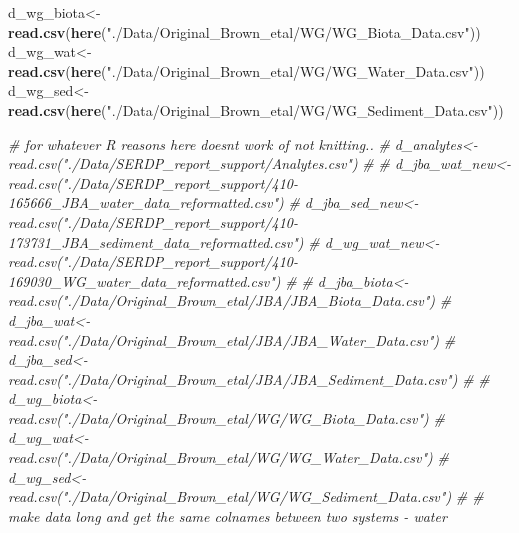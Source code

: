 \documentclass[
]{article}
\newenvironment{Shaded}{\begin{snugshade}}{\end{snugshade}}
\newcommand{\CommentTok}[1]{\textcolor[rgb]{0.56,0.35,0.01}{\textit{#1}}}
\newcommand{\FunctionTok}[1]{\textcolor[rgb]{0.13,0.29,0.53}{\textbf{#1}}}
\newcommand{\NormalTok}[1]{#1}
\newcommand{\OtherTok}[1]{\textcolor[rgb]{0.56,0.35,0.01}{#1}}
\newcommand{\StringTok}[1]{\textcolor[rgb]{0.31,0.60,0.02}{#1}}
\begin{document}
\begin{Shaded}
\begin{Highlighting}[]
\NormalTok{d\_wg\_biota}\OtherTok{\textless{}{-}}\FunctionTok{read.csv}\NormalTok{(}\FunctionTok{here}\NormalTok{(}\StringTok{"./Data/Original\_Brown\_etal/WG/WG\_Biota\_Data.csv"}\NormalTok{))}
\NormalTok{d\_wg\_wat}\OtherTok{\textless{}{-}}\FunctionTok{read.csv}\NormalTok{(}\FunctionTok{here}\NormalTok{(}\StringTok{"./Data/Original\_Brown\_etal/WG/WG\_Water\_Data.csv"}\NormalTok{))}
\NormalTok{d\_wg\_sed}\OtherTok{\textless{}{-}}\FunctionTok{read.csv}\NormalTok{(}\FunctionTok{here}\NormalTok{(}\StringTok{"./Data/Original\_Brown\_etal/WG/WG\_Sediment\_Data.csv"}\NormalTok{))}

\CommentTok{\# for whatever R reasons here doesnt work of not knitting.. }
\CommentTok{\# d\_analytes\textless{}{-}read.csv("./Data/SERDP\_report\_support/Analytes.csv")}
\CommentTok{\# }
\CommentTok{\# d\_jba\_wat\_new\textless{}{-}read.csv("./Data/SERDP\_report\_support/410{-}165666\_JBA\_water\_data\_reformatted.csv")}
\CommentTok{\# d\_jba\_sed\_new\textless{}{-}read.csv("./Data/SERDP\_report\_support/410{-}173731\_JBA\_sediment\_data\_reformatted.csv")}
\CommentTok{\# d\_wg\_wat\_new\textless{}{-}read.csv("./Data/SERDP\_report\_support/410{-}169030\_WG\_water\_data\_reformatted.csv")}
\CommentTok{\# }
\CommentTok{\# d\_jba\_biota\textless{}{-}read.csv("./Data/Original\_Brown\_etal/JBA/JBA\_Biota\_Data.csv")}
\CommentTok{\# d\_jba\_wat\textless{}{-}read.csv("./Data/Original\_Brown\_etal/JBA/JBA\_Water\_Data.csv")}
\CommentTok{\# d\_jba\_sed\textless{}{-}read.csv("./Data/Original\_Brown\_etal/JBA/JBA\_Sediment\_Data.csv")}
\CommentTok{\# }
\CommentTok{\# d\_wg\_biota\textless{}{-}read.csv("./Data/Original\_Brown\_etal/WG/WG\_Biota\_Data.csv")}
\CommentTok{\# d\_wg\_wat\textless{}{-}read.csv("./Data/Original\_Brown\_etal/WG/WG\_Water\_Data.csv")}
\CommentTok{\# d\_wg\_sed\textless{}{-}read.csv("./Data/Original\_Brown\_etal/WG/WG\_Sediment\_Data.csv")}
\CommentTok{\# \# make data long and get the same colnames between two systems {-} water }
\end{Highlighting}
\end{Shaded}
\end{document}
